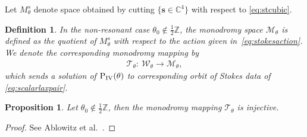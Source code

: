 \documentclass[pdftex]{sigma}
\numberwithin{equation}{section}
\newtheorem{pro}[thm]{Proposition}
\newtheorem*{def*}{Definition}
\begin{document}
Let $M_\theta^s$ denote space obtained by cutting $\big\{\mathbf{s}\in\mathbb{C}^4\big\}$ with respect to \eqref{eq:stcubic}.
\begin{def*}
 In the non-resonant case $\theta_0\notin \tfrac{1}{2}\mathbb{Z}$, the monodromy space $\mathcal{M}_\theta$ is def\/ined as the quotient of $M_\theta^s$ with respect to the action given in~\eqref{eq:stokesaction}. We denote the corresponding monodromy mapping by
 \begin{gather*}
 \mathcal{T}_\theta\colon \ \mathcal{W}_\theta\rightarrow \mathcal{M}_\theta,
 \end{gather*}
 which sends a solution of ${\rm P}_{\rm IV}(\theta)$ to corresponding orbit of Stokes data of \eqref{eq:scalarlaxpair}.
\end{def*}
\begin{pro}\label{pro:injectivenonresonant}
Let $\theta_0\notin \tfrac{1}{2}\mathbb{Z}$, then the monodromy mapping $\mathcal{T}_\theta$ is injective.
\end{pro}
\begin{proof}
	See Ablowitz et al.~\cite{fokasmugan1988}.
\end{proof}
\end{document}
